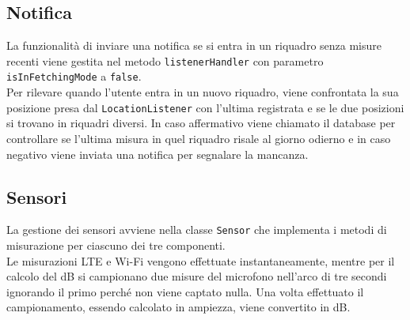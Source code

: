 \documentclass[11pt]{article}
\begin{document}
\subsection{Notifica}
\label{sec:notifica}
La funzionalità di inviare una notifica se si entra in un riquadro senza misure recenti viene gestita nel metodo \texttt{listenerHandler} con parametro \texttt{isInFetchingMode} a \texttt{false}. \\
Per rilevare quando l'utente entra in un nuovo riquadro, viene confrontata la sua posizione presa dal \texttt{LocationListener} con l'ultima registrata e se le due posizioni si trovano in riquadri diversi. In caso affermativo viene chiamato il database per controllare se l'ultima misura in quel riquadro risale al giorno odierno e in caso negativo viene inviata una notifica per segnalare la mancanza.
\subsection{Sensori}
La gestione dei sensori avviene nella classe \texttt{Sensor} che implementa i metodi di misurazione per ciascuno dei tre componenti. \\
Le misurazioni LTE e Wi-Fi vengono effettuate instantaneamente, mentre per il calcolo del dB si campionano due misure del microfono nell'arco di tre secondi ignorando il primo perché non viene captato nulla. Una volta effettuato il campionamento, essendo calcolato in ampiezza, viene convertito in dB.
\end{document}

